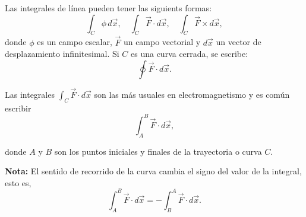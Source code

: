 Las integrales de línea pueden tener las siguients formas:
\begin{equation}
\int_C \phi \, d\vec{x}, \quad \int_C \vec{F} \cdot d\vec{x}, \quad \int_C \vec{F} \times d\vec{x},
\end{equation}
donde $\phi$ es un campo escalar, $\vec{F}$ un campo vectorial y $d\vec{x}$ un vector de desplazamiento infinitesimal. Si $C$ es una curva cerrada, se escribe: 
\begin{equation}
\oint \vec{F} \cdot d\vec{x}.
\end{equation}

Las integrales $\int_C \vec{F} \cdot d\vec{x}$ son las más usuales en electromagnetismo y es común escribir
$$\int_A^B \Vec{F} \cdot d\vec{x},$$

donde $A$ y $B$ son los puntos iniciales y finales de la trayectoria o curva $C$.

\textbf{Nota:} El sentido de recorrido de la curva cambia el signo del valor de la integral, esto es,
$$\int_A^B \Vec{F} \cdot d\Vec{x} = - \int_B^A \Vec{F} \cdot d\Vec{x}. $$

